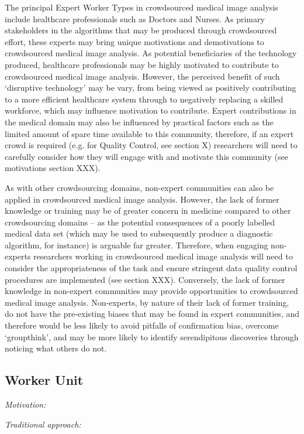 \documentclass[10pt,twocolumn,letterpaper]{article}
\begin{document}
The principal Expert Worker Types in crowdsourced medical image analysis include healthcare professionals such as Doctors and Nurses. As primary stakeholders in the algorithms that may be produced through crowdsourced effort, these experts may bring unique motivations and demotivations to crowdsourced medical image analysis. As potential beneficiaries of the technology produced, healthcare professionals may be highly motivated to contribute to crowdsourced medical image analysis. However, the perceived benefit of such ‘disruptive technology’ may be vary, from being viewed as positively contributing to a more efficient healthcare system through to negatively replacing a skilled workforce, which may influence motivation to contribute. Expert contributions in the medical domain may also be influenced by practical factors such as the limited amount of spare time available to this community, therefore, if an expert crowd is required (e.g. for Quality Control, see section X) researchers will need to carefully consider how they will engage with and motivate this community (see motivations section XXX).

As with other crowdsourcing domains, non-expert communities can also be applied in crowdsourced medical image analysis. However, the lack of former knowledge or training may be of greater concern in medicine compared to other crowdsourcing domains – as the potential consequences of a poorly labelled medical data set (which may be used to subsequently produce a diagnostic algorithm, for instance) is arguable far greater. Therefore, when engaging non-experts researchers working in crowdsourced medical image analysis will need to consider the appropriateness of the task and ensure stringent data quality control procedures are implemented (see section XXX). Conversely, the lack of former knowledge in non-expert communities may provide opportunities to crowdsourced medical image analysis. Non-experts, by nature of their lack of former training, do not have the pre-existing biases that may be found in expert communities, and therefore would be less likely to avoid pitfalls of confirmation bias, overcome ‘groupthink’, and may be more likely to identify serendipitous discoveries through noticing what others do not. 

\subsection{Worker Unit}
\emph{Motivation:} 

\emph{Traditional approach:}
\end{document}
